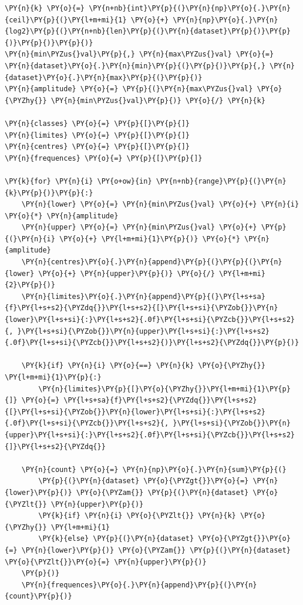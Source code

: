     \begin{tcolorbox}[breakable, size=fbox, boxrule=1pt, pad at break*=1mm,colback=cellbackground, colframe=cellborder]
\begin{Verbatim}[commandchars=\\\{\}]
\PY{n}{k} \PY{o}{=} \PY{n+nb}{int}\PY{p}{(}\PY{n}{np}\PY{o}{.}\PY{n}{ceil}\PY{p}{(}\PY{l+m+mi}{1} \PY{o}{+} \PY{n}{np}\PY{o}{.}\PY{n}{log2}\PY{p}{(}\PY{n+nb}{len}\PY{p}{(}\PY{n}{dataset}\PY{p}{)}\PY{p}{)}\PY{p}{)}\PY{p}{)}
\PY{n}{min\PYZus{}val}\PY{p}{,} \PY{n}{max\PYZus{}val} \PY{o}{=} \PY{n}{dataset}\PY{o}{.}\PY{n}{min}\PY{p}{(}\PY{p}{)}\PY{p}{,} \PY{n}{dataset}\PY{o}{.}\PY{n}{max}\PY{p}{(}\PY{p}{)}
\PY{n}{amplitude} \PY{o}{=} \PY{p}{(}\PY{n}{max\PYZus{}val} \PY{o}{\PYZhy{}} \PY{n}{min\PYZus{}val}\PY{p}{)} \PY{o}{/} \PY{n}{k}

\PY{n}{classes} \PY{o}{=} \PY{p}{[}\PY{p}{]}
\PY{n}{limites} \PY{o}{=} \PY{p}{[}\PY{p}{]}
\PY{n}{centres} \PY{o}{=} \PY{p}{[}\PY{p}{]}
\PY{n}{frequences} \PY{o}{=} \PY{p}{[}\PY{p}{]}

\PY{k}{for} \PY{n}{i} \PY{o+ow}{in} \PY{n+nb}{range}\PY{p}{(}\PY{n}{k}\PY{p}{)}\PY{p}{:}
    \PY{n}{lower} \PY{o}{=} \PY{n}{min\PYZus{}val} \PY{o}{+} \PY{n}{i} \PY{o}{*} \PY{n}{amplitude}
    \PY{n}{upper} \PY{o}{=} \PY{n}{min\PYZus{}val} \PY{o}{+} \PY{p}{(}\PY{n}{i} \PY{o}{+} \PY{l+m+mi}{1}\PY{p}{)} \PY{o}{*} \PY{n}{amplitude}
    \PY{n}{centres}\PY{o}{.}\PY{n}{append}\PY{p}{(}\PY{p}{(}\PY{n}{lower} \PY{o}{+} \PY{n}{upper}\PY{p}{)} \PY{o}{/} \PY{l+m+mi}{2}\PY{p}{)}
    \PY{n}{limites}\PY{o}{.}\PY{n}{append}\PY{p}{(}\PY{l+s+sa}{f}\PY{l+s+s2}{\PYZdq{}}\PY{l+s+s2}{[}\PY{l+s+si}{\PYZob{}}\PY{n}{lower}\PY{l+s+si}{:}\PY{l+s+s2}{.0f}\PY{l+s+si}{\PYZcb{}}\PY{l+s+s2}{, }\PY{l+s+si}{\PYZob{}}\PY{n}{upper}\PY{l+s+si}{:}\PY{l+s+s2}{.0f}\PY{l+s+si}{\PYZcb{}}\PY{l+s+s2}{)}\PY{l+s+s2}{\PYZdq{}}\PY{p}{)}

    \PY{k}{if} \PY{n}{i} \PY{o}{==} \PY{n}{k} \PY{o}{\PYZhy{}} \PY{l+m+mi}{1}\PY{p}{:}
        \PY{n}{limites}\PY{p}{[}\PY{o}{\PYZhy{}}\PY{l+m+mi}{1}\PY{p}{]} \PY{o}{=} \PY{l+s+sa}{f}\PY{l+s+s2}{\PYZdq{}}\PY{l+s+s2}{[}\PY{l+s+si}{\PYZob{}}\PY{n}{lower}\PY{l+s+si}{:}\PY{l+s+s2}{.0f}\PY{l+s+si}{\PYZcb{}}\PY{l+s+s2}{, }\PY{l+s+si}{\PYZob{}}\PY{n}{upper}\PY{l+s+si}{:}\PY{l+s+s2}{.0f}\PY{l+s+si}{\PYZcb{}}\PY{l+s+s2}{]}\PY{l+s+s2}{\PYZdq{}}

    \PY{n}{count} \PY{o}{=} \PY{n}{np}\PY{o}{.}\PY{n}{sum}\PY{p}{(}
        \PY{p}{(}\PY{n}{dataset} \PY{o}{\PYZgt{}}\PY{o}{=} \PY{n}{lower}\PY{p}{)} \PY{o}{\PYZam{}} \PY{p}{(}\PY{n}{dataset} \PY{o}{\PYZlt{}} \PY{n}{upper}\PY{p}{)}
        \PY{k}{if} \PY{n}{i} \PY{o}{\PYZlt{}} \PY{n}{k} \PY{o}{\PYZhy{}} \PY{l+m+mi}{1}
        \PY{k}{else} \PY{p}{(}\PY{n}{dataset} \PY{o}{\PYZgt{}}\PY{o}{=} \PY{n}{lower}\PY{p}{)} \PY{o}{\PYZam{}} \PY{p}{(}\PY{n}{dataset} \PY{o}{\PYZlt{}}\PY{o}{=} \PY{n}{upper}\PY{p}{)}
    \PY{p}{)}
    \PY{n}{frequences}\PY{o}{.}\PY{n}{append}\PY{p}{(}\PY{n}{count}\PY{p}{)}


\end{Verbatim}
\end{tcolorbox}
